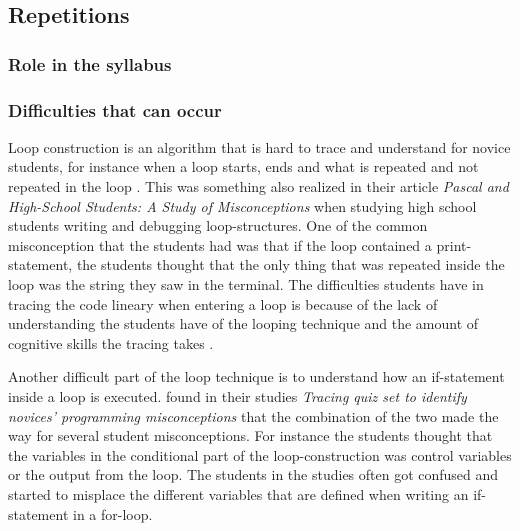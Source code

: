 \subsection{Repetitions}

\subsubsection{Role in the syllabus}

\subsubsection{Difficulties that can occur}

Loop construction is an algorithm that is hard to trace and understand for 
novice students, for instance when a loop starts, ends and what is repeated and 
not repeated in the loop \parencite{Sekiya2013,KumarVeerasamy2016,Kaczmarczyk2010}. 
This was something \textcite{Sleeman1984} also 
realized in their article \emph{Pascal and High-School Students: A Study of 
Misconceptions} when studying high school students writing and debugging 
loop-structures. One of the common misconception that the students had was that 
if the loop contained a print-statement, the students thought that the only 
thing that was repeated inside the loop was the string they saw in the 
terminal. The difficulties students have in tracing the code lineary when 
entering a loop is because of the lack of understanding the students have of 
the looping technique and the amount of cognitive skills the tracing takes 
\parencite{Veerasamy2016}. 

Another difficult part of the loop technique is to understand how an if-statement inside a loop is executed. \textcite{Sekiya2013} found in their studies \emph{Tracing quiz set to identify novices' programming misconceptions} that the combination of the two made the way for several student misconceptions. For instance the students thought that the variables in the conditional part of the loop-construction was control variables or the output from the loop. The students in the studies often got confused and started to misplace the different variables that are defined when writing an if-statement in a for-loop.

